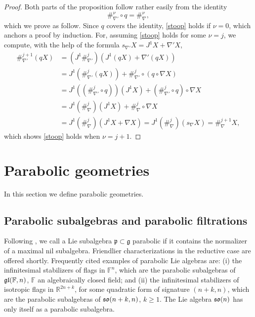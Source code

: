 \documentclass[leqno,12pt]{amsart} %
\newcommand\refreshpage{\newpage}
\newcommand\refreshpage{}
\begin{document}
\begin{proof}
  Both parts of the proposition follow rather easily from the identity
  \begin{equation}
    \label{stoop}
    \#_{\nabla'}^\nu \circ q = \#_\nabla^\nu,
  \end{equation}
  which we prove as follow. Since $q$ covers the identity, \eqref{stoop} holds if $\nu=0$,
  which anchors a proof by induction. For, assuming \eqref{stoop} holds for some $\nu=j$,
  we compute, with the help of the formula $s_{\nabla'}X =J^1 X + \nabla' X$,
  \begin{align*}
    \#_{\nabla'}^{j+1} (qX) &= (J^1\#_{\nabla'}^j)(J^1(qX) + \nabla'(qX)) \\
    &= J^1(\#_{\nabla'}^j(qX)) + \#_{\nabla'}^j \circ (q \circ \nabla X)\\
    &= J^1((\#_{\nabla'}^j \circ q))(J^1X) + (\#_{\nabla'}^j \circ q) \circ \nabla X\\
    &= J^1(\#_{\nabla}^j )(J^1X) + \#_{\nabla}^j \circ \nabla X\\
    &= J^1(\#_{\nabla}^j )(J^1X + \nabla X) = J^1(\#_\nabla^j)(s_\nabla X) = \#_\nabla^{j+1}X,
  \end{align*}
  which shows \eqref{stoop} holds when $\nu=j+1$.
\end{proof}

\refreshpage
\section{Parabolic geometries}\label{parabolic_summary}
In this section we define parabolic geometries.

\subsection{Parabolic subalgebras and parabolic filtrations}\label{canonical_filtrations_}
Following \cite{Calderbank_Noppakaew_16}, we call a Lie subalgebra
${\mathfrak p} \subset {\mathfrak g} $ {\df parabolic} if it contains the normalizer of a
maximal nil subalgebra. Friendlier characterizations in the reductive case are offered
shortly.  Frequently cited examples of parabolic Lie algebras are: (i) the infinitesimal
stabilizers of flags in ${\mathbb F}^n $, which are the parabolic subalgebras of
$\mathfrak{gl}({\mathbb F}, n)$, ${\mathbb F}$ an algebraically closed field; and (ii) the
infinitesimal stabilizers of isotropic flags in ${\mathbb R}^{2n +k}$, for some quadratic
form of signature $(n + k, n)$, which are the parabolic subalgebras of $\mathfrak{so}(n + k, n)$,
$k \ge 1$. The Lie algebra $\mathfrak{so}(n)$ has only itself as a parabolic subalgebra.
\end{document}

